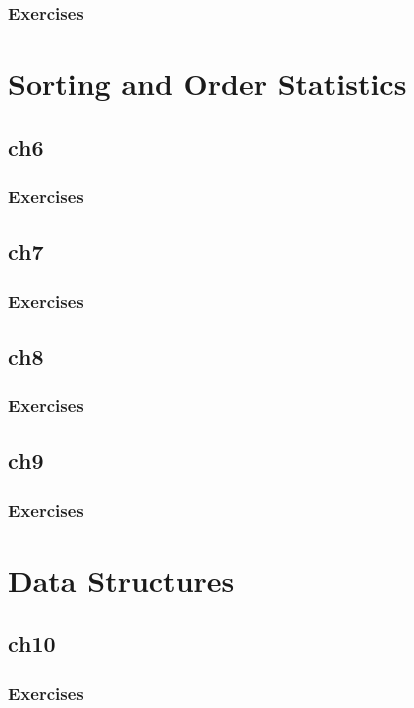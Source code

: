 \documentclass[a4paper, 11pt, fleqn]{report}
\begin{document}
            \section*{Exercises}
    \part{Sorting and Order Statistics}
        \chapter{ch6}
            \section*{Exercises}
        \chapter{ch7}
            \section*{Exercises}
        \chapter{ch8}
            \section*{Exercises}
        \chapter{ch9}
            \section*{Exercises}
    \part{Data Structures}
        \chapter{ch10}
            \section*{Exercises}
\end{document}
